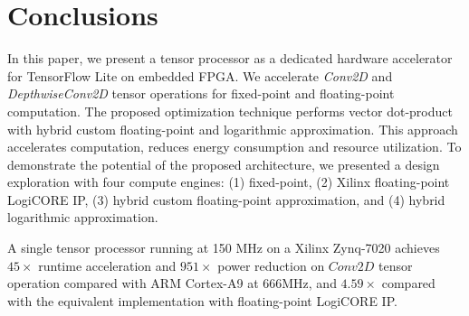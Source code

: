 \section{Conclusions}
\label{sec:conclusions}

In this paper, we present a tensor processor as a dedicated hardware accelerator for TensorFlow Lite on embedded FPGA. We accelerate \emph{Conv2D} and \emph{DepthwiseConv2D} tensor operations for fixed-point and floating-point computation. The proposed optimization technique performs vector dot-product with hybrid custom floating-point and logarithmic approximation. This approach accelerates computation, reduces energy consumption and resource utilization. To demonstrate the potential of the proposed architecture, we presented a design exploration with four compute engines: (1) fixed-point, (2) Xilinx floating-point LogiCORE IP, (3) hybrid custom floating-point approximation, and (4) hybrid logarithmic approximation.

A single tensor processor running at 150 MHz on a Xilinx Zynq-7020 achieves $45\times$ runtime acceleration and $951\times$ power reduction on $Conv2D$ tensor operation compared with ARM Cortex-A9 at 666MHz, and $4.59\times$ compared with the equivalent implementation with floating-point LogiCORE IP.